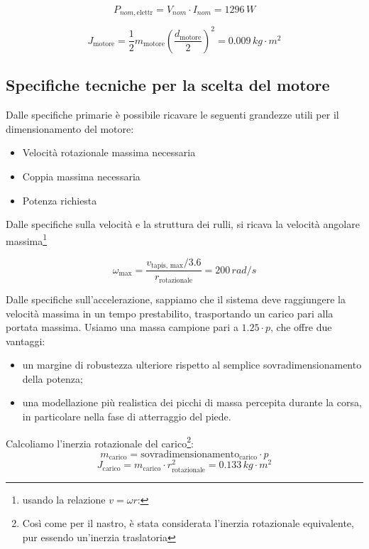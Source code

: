 \documentclass[a4paper,12pt]{article}
\begin{document}
\[
    P_{nom, \text{elettr}} = V_{nom} \cdot I_{nom} = 1296\,W
\]

\[
    J_{\text{motore}} = \frac{1}{2} m_{\text{motore}} \left(\frac{d_{\text{motore}}}{2}\right)^2 = 0.009 \, kg \cdot m^2
\]

\vspace{0.5em}

\subsection{Specifiche tecniche per la scelta del motore}

Dalle specifiche primarie è possibile ricavare le seguenti grandezze utili per il dimensionamento del motore:

\begin{itemize}
    \item Velocità rotazionale massima necessaria
    \item Coppia massima necessaria
    \item Potenza richiesta
\end{itemize}

\vspace{0.5em}

Dalle specifiche sulla velocità e la struttura dei rulli, si ricava la velocità angolare massima\footnote{usando la relazione \( v = \omega r \):}

\[
    \omega_{\text{max}} = \frac{v_{\text{tapis, max}} / 3.6}{r_{\text{rotazionale}}} = 200 \,rad/s
\]

\vspace{0.5em}
 
Dalle specifiche sull'accelerazione, sappiamo che il sistema deve raggiungere la velocità massima in un tempo prestabilito, trasportando un carico pari alla portata massima. Usiamo una massa campione pari a \(1.25 \cdot p\), che offre due vantaggi:

\begin{itemize}
    \item un margine di robustezza ulteriore rispetto al semplice sovradimensionamento della potenza;
    \item una modellazione più realistica dei picchi di massa percepita durante la corsa, in particolare nella fase di atterraggio del piede.
\end{itemize}

\vspace{0.5em}

Calcoliamo l'inerzia rotazionale del carico\footnote{Così come per il nastro, è stata considerata l'inerzia rotazionale equivalente, pur essendo un'inerzia traslatoria}:
\[
    m_{\text{carico}} = \text{sovradimensionamento}_{\text{carico}} \cdot       p
\]
\[
    J_{\text{carico}} = m_{\text{carico}} \cdot r_{\text{rotazionale}}^2= 0.133 \, kg \cdot m^2
\]
\end{document}
